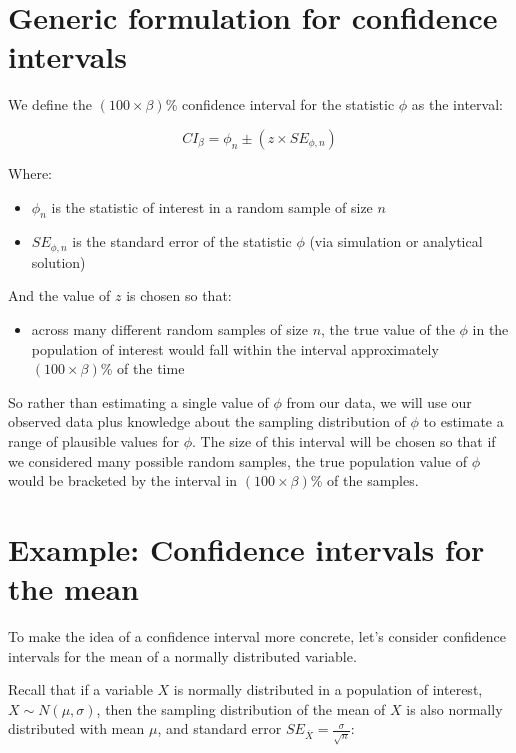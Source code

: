 \documentclass[]{book}
\providecommand{\tightlist}{%
  \setlength{\itemsep}{0pt}\setlength{\parskip}{0pt}}
\theoremstyle{definition}
\theoremstyle{definition}
\theoremstyle{definition}
\theoremstyle{remark}
\begin{document}
\hypertarget{generic-formulation-for-confidence-intervals}{%
\section{Generic formulation for confidence
intervals}\label{generic-formulation-for-confidence-intervals}}

We define the \((100\times\beta)\)\% confidence interval for the
statistic \(\phi\) as the interval:

\[
CI_\beta = \phi_{n} \pm (z \times {SE}_{\phi,n})
\]

Where:

\begin{itemize}
\tightlist
\item
  \(\phi_{n}\) is the statistic of interest in a random sample of size
  \(n\)
\item
  \({SE}_{\phi,n}\) is the standard error of the statistic \(\phi\) (via
  simulation or analytical solution)
\end{itemize}

And the value of \(z\) is chosen so that:

\begin{itemize}
\tightlist
\item
  across many different random samples of size \(n\), the true value of
  the \(\phi\) in the population of interest would fall within the
  interval approximately \((100\times\beta)\)\% of the time
\end{itemize}

So rather than estimating a single value of \(\phi\) from our data, we
will use our observed data plus knowledge about the sampling
distribution of \(\phi\) to estimate a range of plausible values for
\(\phi\). The size of this interval will be chosen so that if we
considered many possible random samples, the true population value of
\(\phi\) would be bracketed by the interval in \((100\times\beta)\)\% of
the samples.

\hypertarget{example-confidence-intervals-for-the-mean}{%
\section{Example: Confidence intervals for the
mean}\label{example-confidence-intervals-for-the-mean}}

To make the idea of a confidence interval more concrete, let's consider
confidence intervals for the mean of a normally distributed variable.

Recall that if a variable \(X\) is normally distributed in a population
of interest, \(X \sim N(\mu, \sigma)\), then the sampling distribution
of the mean of \(X\) is also normally distributed with mean \(\mu\), and
standard error \({SE}_{\overline{X}} = \frac{\sigma}{\sqrt{n}}\):
\end{document}

